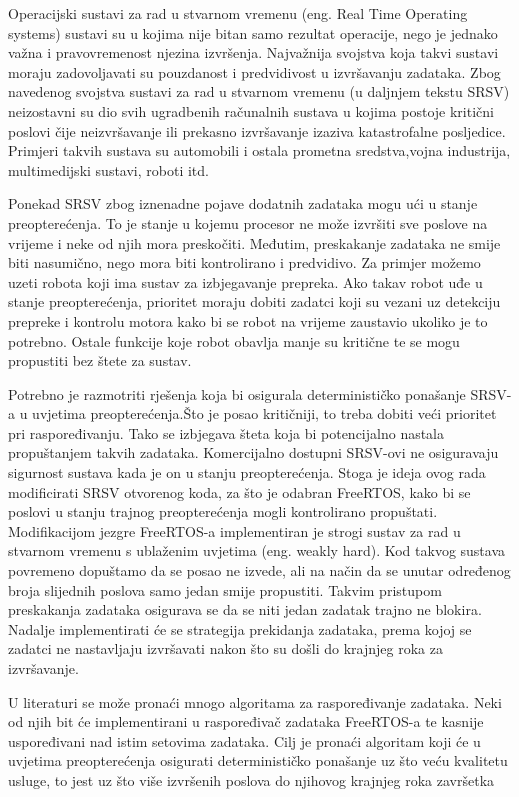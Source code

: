 \documentclass[../zavrsni.tex]{subfiles}
\begin{document}
Operacijski sustavi za rad u stvarnom vremenu (eng. Real Time Operating systems) sustavi su u kojima nije bitan samo
rezultat operacije, nego je jednako važna i pravovremenost njezina izvršenja. Najvažnija svojstva koja takvi sustavi moraju
zadovoljavati su pouzdanost i predvidivost u izvršavanju zadataka.
Zbog navedenog svojstva sustavi za rad u stvarnom vremenu (u daljnjem tekstu SRSV) neizostavni su dio svih ugradbenih 
računalnih sustava u kojima postoje kritični poslovi čije neizvršavanje ili prekasno izvršavanje izaziva katastrofalne
posljedice. Primjeri takvih sustava su automobili i ostala prometna sredstva,vojna industrija, multimedijski sustavi, roboti itd. 

Ponekad SRSV zbog iznenadne pojave dodatnih zadataka mogu ući u stanje preopterećenja. To je stanje u kojemu procesor ne može 
izvršiti sve poslove na vrijeme i neke od njih mora preskočiti. Međutim, preskakanje zadataka ne smije biti nasumično, nego
mora biti kontrolirano i predvidivo. 
Za primjer možemo uzeti robota koji ima sustav za izbjegavanje prepreka. Ako takav robot uđe u stanje preopterećenja, prioritet 
moraju dobiti zadatci koji su vezani uz detekciju prepreke i kontrolu motora kako bi se robot na vrijeme zaustavio ukoliko je to potrebno.
Ostale funkcije koje robot obavlja manje su kritične te se mogu propustiti bez štete za sustav.

Potrebno je razmotriti rješenja koja bi osigurala determinističko ponašanje SRSV-a u uvjetima preopterećenja.Što je posao kritičniji,
to treba dobiti veći prioritet pri raspoređivanju. Tako se izbjegava šteta koja bi potencijalno nastala propuštanjem takvih zadataka. 
Komercijalno dostupni SRSV-ovi ne osiguravaju sigurnost sustava kada je on u stanju preopterećenja. Stoga je ideja ovog rada 
modificirati SRSV otvorenog koda, za što je odabran FreeRTOS, kako bi se poslovi u stanju trajnog preopterećenja mogli kontrolirano propuštati. 
Modifikacijom jezgre FreeRTOS-a implementiran je strogi sustav za rad u stvarnom vremenu s ublaženim uvjetima (eng. weakly hard). Kod takvog sustava
povremeno dopuštamo da se posao ne izvede, ali na način da se unutar određenog broja slijednih poslova samo jedan smije propustiti.
Takvim pristupom preskakanja zadataka osigurava se da se niti jedan zadatak trajno ne blokira. Nadalje implementirati će se strategija 
prekidanja zadataka, prema kojoj se zadatci ne nastavljaju izvršavati nakon što su došli do krajnjeg roka za izvršavanje.

U literaturi se može pronaći mnogo algoritama za raspoređivanje zadataka. Neki od njih bit će implementirani u raspoređivač zadataka FreeRTOS-a 
te kasnije uspoređivani nad istim setovima zadataka. Cilj je pronaći algoritam koji će u uvjetima preopterećenja osigurati 
determinističko ponašanje uz što veću kvalitetu usluge, to jest uz što više izvršenih poslova do njihovog krajnjeg roka završetka
\end{document}
